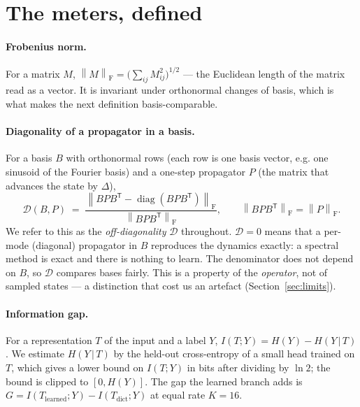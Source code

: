\documentclass[11pt,a4paper]{article}
\newcommand{\Dm}{\mathcal{D}}
\newcommand{\norm}[1]{\left\lVert #1 \right\rVert}
\newcommand{\Fro}[1]{\norm{#1}_{\mathrm F}}
\begin{document}
\section{The meters, defined}\label{sec:meters}
\paragraph{Frobenius norm.} For a matrix $M$, $\Fro{M} = \big(\sum_{ij} M_{ij}^2\big)^{1/2}$ — the Euclidean length of the matrix read as a vector. It is invariant under orthonormal changes of basis, which is what makes the next definition basis-comparable.

\paragraph{Diagonality of a propagator in a basis.} For a basis $B$ with orthonormal rows (each row is one basis vector, e.g. one sinusoid of the Fourier basis) and a one-step propagator $P$ (the matrix that advances the state by $\Delta$),
\begin{equation}
\Dm(B,P) \;=\; \frac{\Fro{BPB^{\mathsf T} - \operatorname{diag}(BPB^{\mathsf T})}}{\Fro{BPB^{\mathsf T}}},
\qquad \Fro{BPB^{\mathsf T}} = \Fro{P}.
\label{eq:D}
\end{equation}
We refer to this as the \emph{off-diagonality} $\Dm$ throughout. $\Dm = 0$ means that a per-mode (diagonal) propagator in $B$ reproduces the dynamics exactly: a spectral method is exact and there is nothing to learn. The denominator does not depend on $B$, so $\Dm$ compares bases fairly. This is a property of the \emph{operator}, not of sampled states — a distinction that cost us an artefact (Section~\ref{sec:limits}).

\paragraph{Information gap.} For a representation $T$ of the input and a label $Y$, $I(T;Y) = H(Y) - H(Y\,|\,T)$. We estimate $H(Y\,|\,T)$ by the held-out cross-entropy of a small head trained on $T$, which gives a lower bound on $I(T;Y)$ in bits after dividing by $\ln 2$; the bound is clipped to $[0, H(Y)]$. The gap the learned branch adds is $G = I(T_{\mathrm{learned}};Y) - I(T_{\mathrm{dict}};Y)$ at equal rate $K=16$.
\end{document}
